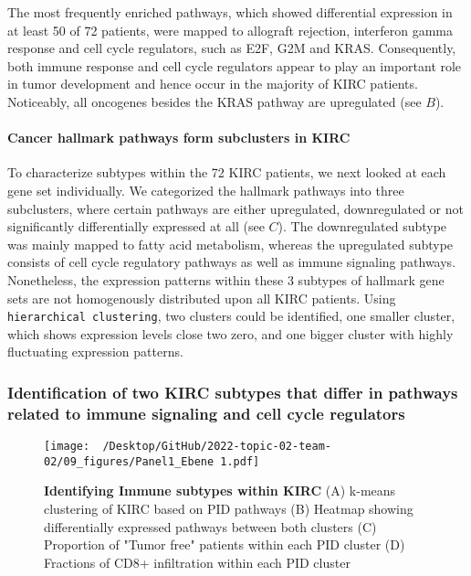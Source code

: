 \documentclass[
  parskip,
  oneside]{\documentclass[oneside]{book}}
\begin{document}
The most frequently enriched pathways, which showed differential
expression in at least 50 of 72 patients, were mapped to allograft
rejection, interferon gamma response and cell cycle regulators, such as
E2F, G2M and KRAS. Consequently, both immune response and cell cycle
regulators appear to play an important role in tumor development and
hence occur in the majority of KIRC patients. Noticeably, all oncogenes
besides the KRAS pathway are upregulated (see  \(B\)).

\hypertarget{cancer-hallmark-pathways-form-subclusters-in-kirc}{%
\paragraph{Cancer hallmark pathways form subclusters in
KIRC}\label{cancer-hallmark-pathways-form-subclusters-in-kirc}}

To characterize subtypes within the 72 KIRC patients, we next looked at
each gene set individually. We categorized the hallmark pathways into
three subclusters, where certain pathways are either upregulated,
downregulated or not significantly differentially expressed at all (see
 \(C\)). The downregulated subtype was mainly mapped to
fatty acid metabolism, whereas the upregulated subtype consists of cell
cycle regulatory pathways as well as immune signaling pathways.
Nonetheless, the expression patterns within these 3 subtypes of hallmark
gene sets are not homogenously distributed upon all KIRC patients. Using
\texttt{hierarchical\ clustering}, two clusters could be identified, one
smaller cluster, which shows expression levels close two zero, and one
bigger cluster with highly fluctuating expression patterns.

\hypertarget{identification-of-two-kirc-subtypes-that-differ-in-pathways-related-to-immune-signaling-and-cell-cycle-regulators}{%
\subsubsection{Identification of two KIRC subtypes that differ in
pathways related to immune signaling and cell cycle
regulators}\label{identification-of-two-kirc-subtypes-that-differ-in-pathways-related-to-immune-signaling-and-cell-cycle-regulators}}

\begin{figure}[h]
  \texttt{[image: ~/Desktop/GitHub/2022-topic-02-team-02/09\_figures/Panel1\_Ebene 1.pdf]}
  \caption{\textbf{Identifying Immune subtypes within KIRC }(A) k-means clustering of KIRC based on PID pathways (B) Heatmap showing differentially expressed pathways between both clusters (C) Proportion of "Tumor free" patients within each PID cluster (D) Fractions of CD8+ infiltration within each PID cluster}
  \label{pid}
\end{figure}
\end{document}
